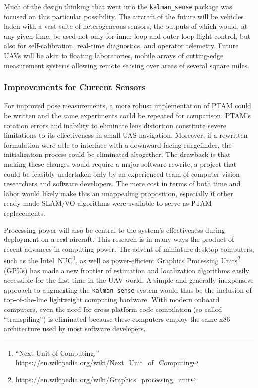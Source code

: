Much of the design thinking that went into the \texttt{kalman\_sense} package was focused on this particular possibility. The aircraft of the future will be vehicles laden with a vast suite of heterogeneous sensors, the outputs of which would, at any given time, be used not only for inner-loop and outer-loop flight control, but also for self-calibration, real-time diagnostics, and operator telemetry. Future UAVs will be akin to floating laboratories, mobile arrays of cutting-edge measurement systems allowing remote sensing over areas of several square miles.

\subsubsection{Improvements for Current Sensors}

For improved pose measurements, a more robust implementation of PTAM could be written and the same experiments could be repeated for comparison. PTAM's rotation errors and inability to eliminate lens distortion constitute severe limitations to its effectiveness in small UAS navigation. Moreover, if a rewritten formulation were able to interface with a downward-facing rangefinder, the initialization process could be eliminated altogether. The drawback is that making these changes would require a major software rewrite, a project that could be feasibly undertaken only by an experienced team of computer vision researchers and software developers. The mere cost in terms of both time and labor would likely make this an unappealing proposition, especially if other ready-made SLAM/VO algorithms were available to serve as PTAM replacements.

Processing power will also be central to the system's effectiveness during deployment on a real aircraft. This research is in many ways the product of recent advances in computing power. The advent of miniature desktop computers, such as the Intel~NUC\footnote{``Next Unit of Computing,'' \url{https://en.wikipedia.org/wiki/Next_Unit_of_Computing}}, as well as power-efficient Graphics Processing Units\footnote{\url{https://en.wikipedia.org/wiki/Graphics_processing_unit}} (GPUs) has made a new frontier of estimation and localization algorithms easily accessible for the first time in the UAV world. A simple and generally inexpensive approach to augmenting the \texttt{kalman\_sense} system would thus be the inclusion of top-of-the-line lightweight computing hardware. With modern onboard computers, even the need for cross-platform code compilation (so-called ``transpiling'') is eliminated because these computers employ the same x86 architecture used by most software developers.

